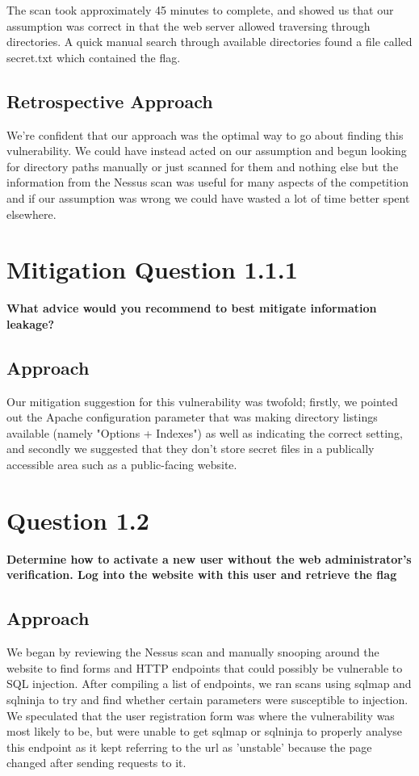 The scan took approximately 45 minutes to complete, and showed us that our
assumption was correct in that the web server allowed traversing through
directories. A quick manual search through available directories found a file
called secret.txt which contained the flag.
\subsection{Retrospective Approach}
We're confident that our approach was the optimal way to go about finding this
vulnerability. We could have instead acted on our assumption and begun looking
for directory paths manually or just scanned for them and nothing else but the
information from the Nessus scan was useful for many aspects of the competition
and if our assumption was wrong we could have wasted a lot of time better spent
elsewhere.

\section{Mitigation Question 1.1.1}
\textbf{What advice would you recommend to best mitigate information leakage?}
\subsection{Approach}
Our mitigation suggestion for this vulnerability was twofold; firstly, we pointed
out the Apache configuration parameter that was making directory listings
available (namely "Options + Indexes") as well as indicating the correct
setting, and secondly we suggested that they don't store secret files in a
publically accessible area such as a public-facing website.

\section{Question 1.2}
\textbf{Determine how to activate a new user without the web administrator's
verification. Log into the website with this user and retrieve the flag}
\subsection{Approach}
We began by reviewing the Nessus scan and manually snooping around the website
to find forms and HTTP endpoints that could possibly be vulnerable to SQL
injection. After compiling a list of endpoints, we ran scans using sqlmap and
sqlninja to try and find whether certain parameters were susceptible to
injection. We speculated that the user registration form was where the
vulnerability was most likely to be, but were unable to get sqlmap or sqlninja
to properly analyse this endpoint as it kept referring to the url as 'unstable'
because the page changed after sending requests to it.

